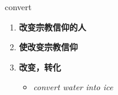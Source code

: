 
\begin{frame}
{\huge convert}
\begin{center}
\begin{enumerate}\Large
  \item \textbf{改变宗教信仰的人}
  \item \textbf{使改变宗教信仰}
  \item \textbf{改变，转化}
  \begin{itemize}
    \item \em{\Large{convert water into ice}}
  \end{itemize}
\end{enumerate}
\end{center}
\end{frame}
